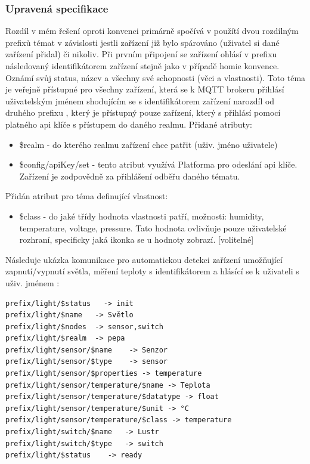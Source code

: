 \subsubsection{Upravená specifikace}
Rozdíl v mém řešení oproti  konvenci primárně spočívá v použítí dvou rozdílným prefixů témat v závislosti jestli zařízení již bylo spárováno (uživatel si dané zařízení přidal) či nikoliv. Při prvním připojení se zařízení ohlásí v prefixu  následovaný identifikátorem zařízení stejně jako v případě homie konvence. Oznámí svůj status, název a všechny své schopnosti (věci a vlastnosti). Toto téma je veřejně přístupné pro všechny zařízení, která se k MQTT brokeru přihlásí uživatelským jménem shodujícím se s identifikátorem zařízení narozdíl od druhého prefixu , který je přístupný pouze zařízení, který s přihlásí pomocí platného api klíče s přístupem do daného realmu. Přidané atributy:
\begin{itemize}
    \item \$realm - do kterého realmu zařízení chce patřit (uživ. jméno uživatele)
    \item \$config/apiKey/set - tento atribut využívá Platforma pro odeslání api klíče. Zařízení je zodpovědně za přihlášení odběřu daného tématu.
\end{itemize}

Přidán atribut pro téma definující vlastnost:
\begin{itemize}
    \item \$class - do jaké třídy hodnota vlastnosti patří, možnosti: humidity, temperature, voltage, pressure. Tato hodnota ovlivňuje pouze uživatelské rozhraní, specificky jaká ikonka se u hodnoty zobrazí. [volitelné]
\end{itemize}


Následuje ukázka komunikace pro automatickou detekci zařízení umožňující zapnutí/vypnutí světla, měření teploty s identifikátorem  a hlásící se k uživateli s uživ. jménem :
\begin{verbatim}
prefix/light/$status   -> init
prefix/light/$name   -> Světlo
prefix/light/$nodes  -> sensor,switch
prefix/light/$realm  -> pepa
prefix/light/sensor/$name    -> Senzor
prefix/light/sensor/$type    -> sensor
prefix/light/sensor/$properties -> temperature
prefix/light/sensor/temperature/$name -> Teplota
prefix/light/sensor/temperature/$datatype -> float
prefix/light/sensor/temperature/$unit -> °C
prefix/light/sensor/temperature/$class -> temperature
prefix/light/switch/$name   -> Lustr
prefix/light/switch/$type   -> switch
prefix/light/$status    -> ready
\end{verbatim}

